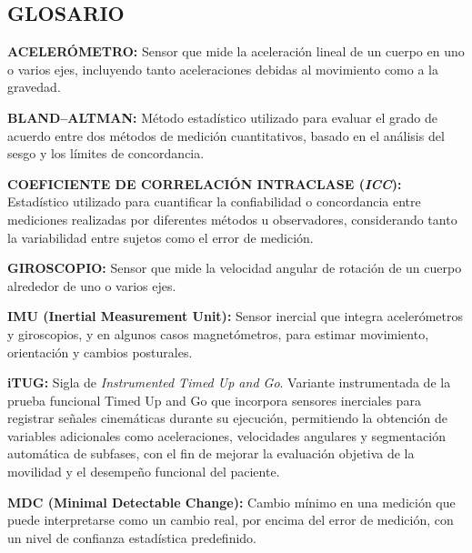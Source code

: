 \documentclass[12pt]{report}
\begin{document}
\begin{justify}

    \clearpage

    {
        \centering \section*{GLOSARIO}
    }

    \noindent \textbf{ACELERÓMETRO:} Sensor que mide la aceleración lineal de un cuerpo en uno o varios ejes, incluyendo tanto aceleraciones debidas al movimiento como a la gravedad.
    \vspace{0.3cm}

    \noindent \textbf{BLAND--ALTMAN:} Método estadístico utilizado para evaluar el grado de acuerdo entre dos métodos de medición cuantitativos, basado en el análisis del sesgo y los límites de concordancia.
    \vspace{0.3cm}

    \noindent \textbf{COEFICIENTE DE CORRELACIÓN INTRACLASE (\textit{ICC}):} Estadístico utilizado para cuantificar la confiabilidad o concordancia entre mediciones realizadas por diferentes métodos u observadores, considerando tanto la variabilidad entre sujetos como el error de medición.
    \vspace{0.3cm}

    \noindent \textbf{GIROSCOPIO:} Sensor que mide la velocidad angular de rotación de un cuerpo alrededor de uno o varios ejes.
    \vspace{0.3cm}

    \noindent \textbf{IMU (Inertial Measurement Unit):} Sensor inercial que integra acelerómetros y giroscopios, y en algunos casos magnetómetros, para estimar movimiento, orientación y cambios posturales.
    \vspace{0.3cm}

    \noindent \textbf{iTUG:} Sigla de \textit{Instrumented Timed Up and Go}. Variante instrumentada de la prueba funcional Timed Up and Go que incorpora sensores inerciales para registrar señales cinemáticas durante su ejecución, permitiendo la obtención de variables adicionales como aceleraciones, velocidades angulares y segmentación automática de subfases, con el fin de mejorar la evaluación objetiva de la movilidad y el desempeño funcional del paciente.
    \vspace{0.3cm}



    \noindent \textbf{MDC (Minimal Detectable Change):} Cambio mínimo en una medición que puede interpretarse como un cambio real, por encima del error de medición, con un nivel de confianza estadística predefinido.
    \vspace{0.3cm}



\end{justify}
\end{document}
